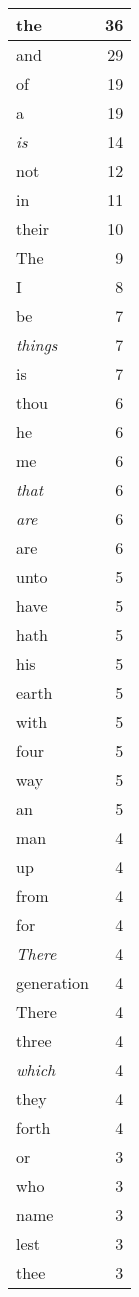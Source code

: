 \begin{center}
\begin{longtable}{l|r}
the & 36\\ \hline 
and & 29\\ \hline 
of & 19\\ \hline 
a & 19\\ \hline 
\emph{is} & 14\\ \hline 
not & 12\\ \hline 
in & 11\\ \hline 
their & 10\\ \hline 
The & 9\\ \hline 
I & 8\\ \hline 
be & 7\\ \hline 
\emph{things} & 7\\ \hline 
is & 7\\ \hline 
thou & 6\\ \hline 
he & 6\\ \hline 
me & 6\\ \hline 
\emph{that} & 6\\ \hline 
\emph{are} & 6\\ \hline 
are & 6\\ \hline 
unto & 5\\ \hline 
have & 5\\ \hline 
hath & 5\\ \hline 
his & 5\\ \hline 
earth & 5\\ \hline 
with & 5\\ \hline 
four & 5\\ \hline 
way & 5\\ \hline 
an & 5\\ \hline 
man & 4\\ \hline 
up & 4\\ \hline 
from & 4\\ \hline 
for & 4\\ \hline 
\emph{There} & 4\\ \hline 
generation & 4\\ \hline 
There & 4\\ \hline 
three & 4\\ \hline 
\emph{which} & 4\\ \hline 
they & 4\\ \hline 
forth & 4\\ \hline 
or & 3\\ \hline 
who & 3\\ \hline 
name & 3\\ \hline 
lest & 3\\ \hline 
thee & 3\\ \hline 

\end{longtable}
\end{center}
